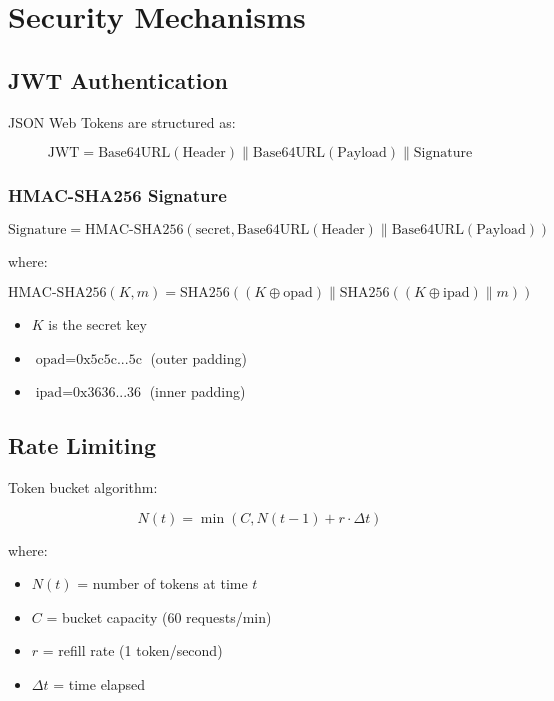 \documentclass[12pt,a4paper]{article}
\begin{document}
\section{Security Mechanisms}

\subsection{JWT Authentication}

JSON Web Tokens are structured as:

$$\text{JWT} = \text{Base64URL}(\text{Header}) \| \text{Base64URL}(\text{Payload}) \| \text{Signature}$$

\subsubsection{HMAC-SHA256 Signature}

$$\text{Signature} = \text{HMAC-SHA256}(\text{secret}, \text{Base64URL}(\text{Header}) \| \text{Base64URL}(\text{Payload}))$$

where:

$$\text{HMAC-SHA256}(K, m) = \text{SHA256}((K \oplus \text{opad}) \| \text{SHA256}((K \oplus \text{ipad}) \| m))$$

\begin{itemize}
    \item $K$ is the secret key
    \item $\text{opad} = \text{0x5c5c...5c}$ (outer padding)
    \item $\text{ipad} = \text{0x3636...36}$ (inner padding)
\end{itemize}

\subsection{Rate Limiting}

Token bucket algorithm:

$$N(t) = \min\left(C, N(t-1) + r \cdot \Delta t\right)$$

where:
\begin{itemize}
    \item $N(t)$ = number of tokens at time $t$
    \item $C$ = bucket capacity (60 requests/min)
    \item $r$ = refill rate (1 token/second)
    \item $\Delta t$ = time elapsed
\end{itemize}
\end{document}
